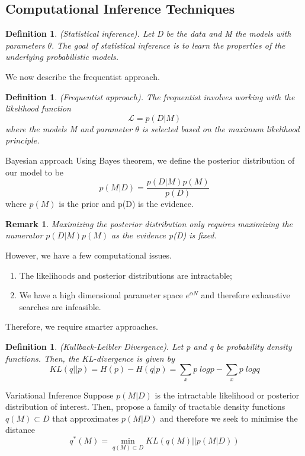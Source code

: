 \documentclass[twoside]{article}
\newtheorem{definition}[theorem]{Definition}
\newtheorem{remark}[theorem]{Remark}
\begin{document}
\subsection{Computational Inference Techniques}
\begin{definition}(Statistical inference). Let D be the data and M the models with parameters $\theta.$ The goal of statistical inference is to learn the properties of the underlying probabilistic models.
\end{definition}

We now describe the frequentist approach.
\begin{definition}(Frequentist approach). The frequentist involves working with the likelihood function 
$$
\mathcal{L} = p(D|M)
$$
where the models M and parameter $\theta$ is selected based on the maximum likelihood principle.
\end{definition}

\begin{definition_exam}{Bayesian approach}{} Using Bayes theorem, we define the posterior distribution of our model to be
$$
p(M|D) = \frac{p(D|M)p(M)}{p(D)}
$$
where $p(M)$ is the prior and p(D) is the evidence.
\end{definition_exam}

\begin{remark}Maximizing the posterior distribution only requires maximizing the numerator $p(D|M)p(M)$ as the evidence p(D) is fixed.
\end{remark}

However, we have a few computational issues.
\begin{enumerate}
\item The likelihoods and posterior distributions are intractable;
\item We have a high dimensional parameter space $e^{\alpha N}$ and therefore exhaustive searches are infeasible.
\end{enumerate}

Therefore, we require smarter approaches.

\begin{definition}(Kullback-Leibler Divergence). Let p and q be probability density functions. Then, the KL-divergence is given by 
$$
KL(q||p) = H(p) - H(q|p) = \sum_xp\;logp - \sum_xp\;logq
$$
\end{definition}

\begin{proposition_exam}{Variational Inference}{} Suppose $p(M|D)$ is the intractable likelihood or posterior distribution of interest. Then, propose a family of tractable density functions $q(M) \subset D$ that approximates $p(M|D)$ and therefore we seek to minimise the distance 
$$
q^*(M) = \min_{q(M) \subset D}KL(q(M)||p(M|D))
$$
\end{proposition_exam} 
\end{document}
